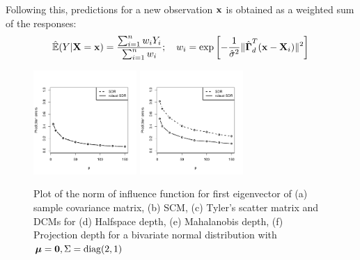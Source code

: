 Following this, predictions for a new observation ${\bf{x}}$ is obtained as a weighted sum of the responses:
%
$$
\hat {{\mathbb{E}}}( Y|{\mathbf{X}}={\bf{x}} ) = \frac{\sum_{i=1}^n w_i Y_i}{\sum_{i=1}^n w_i}; \quad w_i = \exp \left[ -\frac{1}{\hat\sigma^2}  \| \hat{{\boldsymbol{\Gamma}}}^T_d ({\bf{x}} - {\mathbf{X}}_i) \|^2 \right]
$$
%

\begin{figure}
	\centering
	\includegraphics[width=0.35\textwidth]{SDRcomparison_noout}
	\includegraphics[width=0.35\textwidth]{SDRcomparison_out}
	\caption{Plot of the norm of influence function for first eigenvector of (a) sample covariance matrix, (b) SCM, (c) Tyler's scatter matrix and DCMs for (d) Halfspace depth, (e) Mahalanobis depth, (f) Projection depth for a bivariate normal distribution with ${\boldsymbol{\mu}} = {\bf 0}, \Sigma = \operatorname*{diag}(2,1)$}
	\label{fig:SDRfig}
\end{figure}

